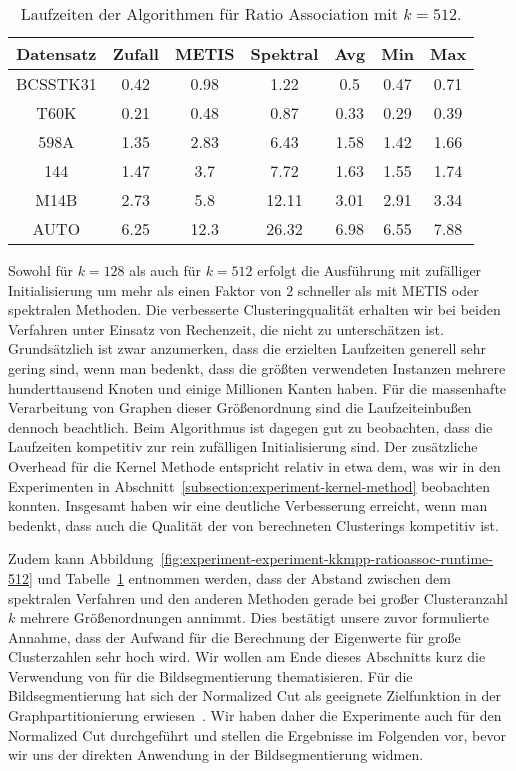 \begin{table}[h!]
\centering
\begin{tabular}{@{}ccccccc@{}} \toprule
	\textbf{Datensatz} & \textbf{Zufall} & \textbf{METIS} & \textbf{Spektral} & \textbf{Avg} & \textbf{Min} & \textbf{Max} \\ \midrule
	BCSSTK31 	& 0.42 & 0.98 & 1.22 & 0.5 & 0.47 & 0.71 \\
	T60K 		& 0.21 & 0.48 & 0.87 & 0.33 & 0.29 & 0.39 \\
	598A 		& 1.35 & 2.83 & 6.43 & 1.58 & 1.42 & 1.66 \\
	144 		& 1.47 & 3.7 & 7.72 & 1.63 & 1.55 & 1.74 \\
	M14B 		& 2.73 & 5.8 & 12.11 & 3.01 & 2.91 & 3.34 \\
	AUTO 		& 6.25 & 12.3 & 26.32 & 6.98 & 6.55 & 7.88 \\
	\bottomrule
\end{tabular}
\caption{Laufzeiten der Algorithmen für Ratio Association mit $k = 512$.}
\label{tbl:experiment-experiment-kkmpp-ratioassoc-runtime-512}
\end{table}

Sowohl für $k = 128$ als auch für $k = 512$ erfolgt die Ausführung mit zufälliger Initialisierung um mehr als einen Faktor von $2$
schneller als mit METIS oder spektralen Methoden. Die verbesserte Clusteringqualität erhalten wir bei beiden Verfahren unter
Einsatz von Rechenzeit, die nicht zu unterschätzen ist. Grundsätzlich ist zwar anzumerken, dass die erzielten Laufzeiten
generell sehr gering sind, wenn man bedenkt, dass die größten verwendeten Instanzen mehrere hunderttausend Knoten und einige
Millionen Kanten haben. Für die massenhafte Verarbeitung von Graphen dieser Größenordnung sind die Laufzeiteinbußen dennoch
beachtlich. Beim Algorithmus \kkmpp{} ist dagegen gut zu beobachten, dass die Laufzeiten kompetitiv zur rein zufälligen
Initialisierung sind. Der zusätzliche Overhead für die Kernel Methode entspricht relativ in etwa dem, was wir in den Experimenten
in Abschnitt~\ref{subsection:experiment-kernel-method} beobachten konnten. Insgesamt haben wir eine deutliche Verbesserung
erreicht, wenn man bedenkt, dass auch die Qualität der von \kkmpp{} berechneten Clusterings kompetitiv ist.

Zudem kann Abbildung~\ref{fig:experiment-experiment-kkmpp-ratioassoc-runtime-512} und
Tabelle~\ref{tbl:experiment-experiment-kkmpp-ratioassoc-runtime-512} entnommen werden, dass der Abstand zwischen dem spektralen
Verfahren und den anderen Methoden gerade bei großer Clusteranzahl $k$ mehrere Größenordnungen annimmt. Dies bestätigt
unsere zuvor formulierte Annahme, dass der Aufwand für die Berechnung der Eigenwerte für große Clusterzahlen sehr hoch wird.
Wir wollen am Ende dieses Abschnitts kurz die Verwendung von \kkmpp{} für die Bildsegmentierung thematisieren. Für die
Bildsegmentierung hat sich der Normalized Cut als geeignete Zielfunktion in der Graphpartitionierung erwiesen~\cite{ShiM00}.
Wir haben daher die Experimente auch für den Normalized Cut durchgeführt und stellen die Ergebnisse im Folgenden vor, bevor
wir uns der direkten Anwendung in der Bildsegmentierung widmen.

